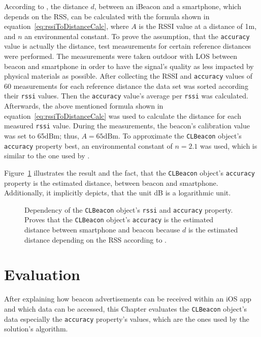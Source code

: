 According to \citet{wang:bt_pos}, the distance $d$, between an iBeacon and a smartphone, which depends on the \acl{RSS}, can be calculated with the formula shown in equation~\ref{eq:rssiToDistanceCalc}, where $A$ is the \acs{RSSI} value at a distance of 1m, and $n$ an environmental constant. To prove the assumption, that the \texttt{accuracy} value is actually the distance, test measurements for certain reference distances were performed. The measurements were taken outdoor with \ac{LOS} between beacon and smartphone in order to have the signal's quality as less impacted by physical materials as possible. After collecting the \acs{RSSI} and \texttt{accuracy} values of 60 measurements for each reference distance the data set was sorted according their \texttt{rssi} values. Then the \texttt{accuracy} value's average per \texttt{rssi} was calculated. Afterwards, the above mentioned formula shown in equation~\ref{eq:rssiToDistanceCalc} was used to calculate the distance for each measured \texttt{rssi} value. During the measurements, the beacon's calibration value was set to 65dBm; thus, $A = 65\text{dBm}$. To approximate the \texttt{CLBeacon} object's \texttt{accuracy} property best, an environmental constant of $n = 2.1$ was used, which is similar to the one used by \citet{wang:bt_pos}.

Figure~\ref{fig:eval_accuracy_vs_distance} illustrates the result and the fact, that the \texttt{CLBeacon} object's \texttt{accuracy} property is the estimated distance, between beacon and smartphone. Additionally, it implicitly depicts, that the unit dB is a logarithmic unit.

\begin{figure}
  
	\caption{Dependency of the \texttt{CLBeacon} object's \texttt{rssi} and \texttt{accuracy} property. Proves that the \texttt{CLBeacon} object's \texttt{accuracy} is the estimated distance between smartphone and beacon because $d$ is the estimated distance depending on the \ac{RSS} according to \citet{wang:bt_pos,kotanen:exp_local_pos_bt}.}
	\label{fig:eval_accuracy_vs_distance}
\end{figure}



\section{Evaluation}\label{sec:beacon_eval}
After explaining how beacon advertisements can be received within an iOS app and which data can be accessed, this Chapter evaluates the \texttt{CLBeacon} object's data especially the \texttt{accuracy} property's values, which are the ones used by the solution's algorithm.

